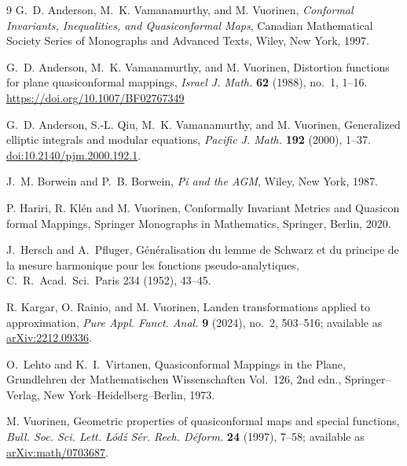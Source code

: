 \documentclass[11pt]{article}
\theoremstyle{remark}
\begin{document}
\begin{thebibliography}{9}
G.~D. Anderson, M.~K. Vamanamurthy, and M. Vuorinen,
\emph{Conformal Invariants, Inequalities, and Quasiconformal Maps},
Canadian Mathematical Society Series of Monographs and Advanced Texts,
Wiley, New York, 1997.


G.~D. Anderson, M.~K. Vamanamurthy, and M. Vuorinen,
\newblock Distortion functions for plane quasiconformal mappings,
\newblock \emph{Israel J. Math.} \textbf{62} (1988), no.~1, 1--16.
\newblock \url{https://doi.org/10.1007/BF02767349}

G.~D. Anderson, S.-L. Qiu, M.~K. Vamanamurthy, and M. Vuorinen,
Generalized elliptic integrals and modular equations,
\emph{Pacific J. Math.} \textbf{192} (2000), 1--37.
\href{https://doi.org/10.2140/pjm.2000.192.1}{doi:10.2140/pjm.2000.192.1}.



J.~M. Borwein and P.~B. Borwein,
\emph{Pi and the AGM},
Wiley, New York, 1987.

 P. Hariri, R. Kl\'{e}n and M. Vuorinen, Conformally Invariant Metrics and Quasicon
formal Mappings, Springer Monographs in Mathematics, Springer, Berlin, 2020.


 J.~Hersch and A.~Pfluger, G\'{e}n\'{e}ralisation du lemme de Schwarz et du principe de la mesure harmonique pour les fonctions pseudo‐analytiques, C.~R.~Acad.~Sci.~Paris 234 (1952), 43--45.



R. Kargar, O. Rainio, and M. Vuorinen,
Landen transformations applied to approximation,
\emph{Pure Appl. Funct. Anal.} \textbf{9} (2024), no.~2, 503--516;
available as
\href{https://arxiv.org/abs/2212.09336}{arXiv:2212.09336}.


O.~Lehto and K.~I.~Virtanen, Quasiconformal Mappings in the Plane, Grundlehren der Mathematischen Wissenschaften Vol.~126, 2nd edn., Springer--Verlag, New York--Heidelberg--Berlin, 1973.


M. Vuorinen,
Geometric properties of quasiconformal maps and special functions,
\emph{Bull. Soc. Sci. Lett. \L\'od\'z S\'er. Rech. D\'eform.}
\textbf{24} (1997), 7--58;
available as
\href{https://arxiv.org/abs/math/0703687}{arXiv:math/0703687}.

\end{thebibliography}
\end{document}
